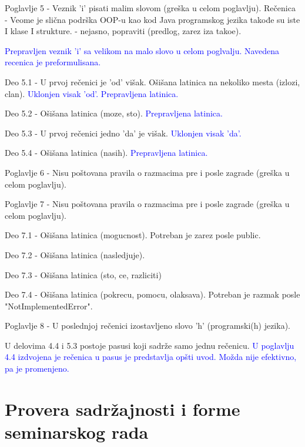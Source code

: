 \documentclass[a4paper]{report}
\newcommand{\odgovor}[1]{\textcolor{blue}{#1}}
\begin{document}
Poglavlje 5 - Veznik 'i' pisati malim slovom (gre\v ska u celom poglavlju).
Re\v cenica - Veome je sli\v cna podr\v ska OOP-u kao kod Java programskog jezika takođe su iste I klase I strukture. - nejasno, popraviti (predlog, zarez iza tako\dj{}e).

\odgovor{
Prepravljen veznik 'i' sa velikom na malo slovo u celom poglvalju. Navedena recenica je preformulisana.
}

Deo 5.1 - U prvoj re\v cenici je 'od' vi\v sak. O\v si\v sana latinica na nekoliko mesta (izlozi, clan).
\odgovor{
Uklonjen visak 'od'. Prepravljena latinica.
}

Deo 5.2 - O\v si\v sana latinica (moze, sto).
\odgovor{
Prepravljena latinica.
}


Deo 5.3 - U prvoj re\v cenici jedno 'da' je vi\v sak.
\odgovor{
Uklonjen visak 'da'.
}

Deo 5.4 - O\v si\v sana latinica (nasih).
\odgovor{
Prepravljena latinica.
}

Poglavlje 6 - Nisu po\v stovana pravila o razmacima pre i posle zagrade (gre\v ska u celom poglavlju).

Poglavlje 7 - Nisu po\v stovana pravila o razmacima pre i posle zagrade (gre\v ska u celom poglavlju).

Deo 7.1 - O\v si\v sana latinica (mogucnost). Potreban je zarez posle public.

Deo 7.2 - O\v si\v sana latinica (nasledjuje).

Deo 7.3 - O\v si\v sana latinica (sto, ce, razliciti)

Deo 7.4 - O\v si\v sana latinica (pokrecu, pomocu, olaksava). Potreban je razmak posle "NotImplementedError".

Poglavlje 8 - U poslednjoj re\v cenici izostavljeno slovo 'h' (programski(h) jezika).

U delovima 4.4 i 5.3 postoje pasusi koji sadr\v ze samo jednu re\v cenicu.
\odgovor{
U poglavlju 4.4 izdvojena je rečenica u pasus je predstavlja opšti uvod. Možda nije efektivno, pa je promenjeno. 
}

\section{Provera sadržajnosti i forme seminarskog rada}
\end{document}

